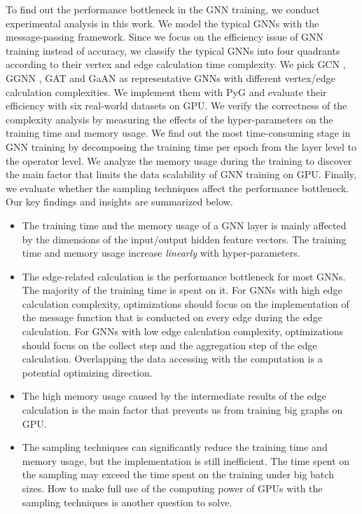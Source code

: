 To find out the performance bottleneck in the GNN training, we conduct experimental analysis in this work.
We model the typical GNNs with the message-passing framework.
Since we focus on the efficiency issue of GNN training instead of accuracy, we classify the typical GNNs into four quadrants according to their vertex and edge calculation time complexity.
We pick GCN \cite{kipf2017_gcn}, GGNN \cite{li2015_ggnn}, GAT \cite{huang2018_gat} and GaAN \cite{zhang2018_gaan} as representative GNNs with different vertex/edge calculation complexities.
We implement them with PyG and evaluate their efficiency with six real-world datasets on GPU.
We verify the correctness of the complexity analysis by measuring the effects of the hyper-parameters on the training time and memory usage.
We find out the most time-consuming stage in GNN training by decomposing the training time per epoch from the layer level to the operator level.
We analyze the memory usage during the training to discover the main factor that limits the data scalability of GNN training on GPU.
Finally, we evaluate whether the sampling techniques affect the performance bottleneck.
Our key findings and insights are summarized below.

\begin{itemize}
    \item The training time and the memory usage of a GNN layer is mainly affected by the dimensions of the input/output hidden feature vectors.
          The training time and memory usage increase \emph{linearly} with hyper-parameters.
    \item The edge-related calculation is the performance bottleneck for most GNNs.
          The majority of the training time is spent on it.
          For GNNs with high edge calculation complexity, optimizations should focus on the implementation of the message function that is conducted on every edge during the edge calculation.
          For GNNs with low edge calculation complexity, optimizations should focus on the collect step and the aggregation step of the edge calculation.
          Overlapping the data accessing with the computation is a potential optimizing direction.
    \item The high memory usage caused by the intermediate results of the edge calculation is the main factor that prevents us from training big graphs on GPU.
    \item The sampling techniques can significantly reduce the training time and memory usage, but the implementation is still inefficient. The time spent on the sampling may exceed the time spent on the training under big batch sizes. How to make full use of the computing power of GPUs with the sampling techniques is another question to solve.
\end{itemize}

